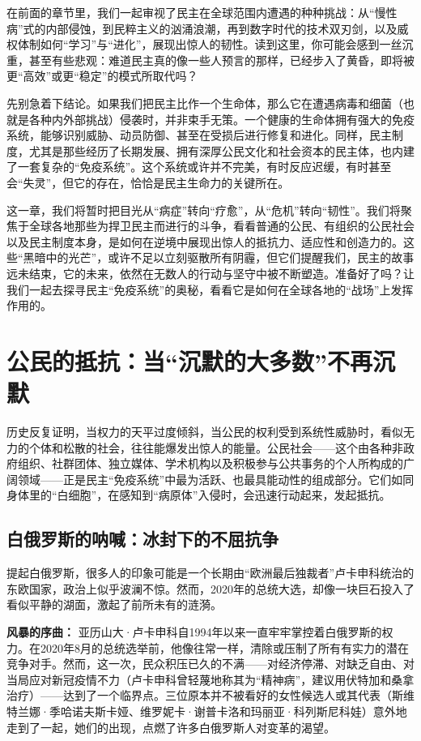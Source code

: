 \documentclass[UTF8, 10pt]{ctexbook}
\begin{document}
\lettrine[lines=3]{在}{前面}的章节里，我们一起审视了民主在全球范围内遭遇的种种挑战：从“慢性病”式的内部侵蚀，到民粹主义的汹涌浪潮，再到数字时代的技术双刃剑，以及威权体制如何“学习”与“进化”，展现出惊人的韧性。读到这里，你可能会感到一丝沉重，甚至有些悲观：难道民主真的像一些人预言的那样，已经步入了黄昏，即将被更“高效”或更“稳定”的模式所取代吗？

先别急着下结论。如果我们把民主比作一个生命体，那么它在遭遇病毒和细菌（也就是各种内外部挑战）侵袭时，并非束手无策。一个健康的生命体拥有强大的免疫系统，能够识别威胁、动员防御、甚至在受损后进行修复和进化。同样，民主制度，尤其是那些经历了长期发展、拥有深厚公民文化和社会资本的民主体，也内建了一套复杂的“免疫系统”。这个系统或许并不完美，有时反应迟缓，有时甚至会“失灵”，但它的存在，恰恰是民主生命力的关键所在。

这一章，我们将暂时把目光从“病症”转向“疗愈”，从“危机”转向“韧性”。我们将聚焦于全球各地那些为捍卫民主而进行的斗争，看看普通的公民、有组织的公民社会以及民主制度本身，是如何在逆境中展现出惊人的抵抗力、适应性和创造力的。这些“黑暗中的光芒”，或许不足以立刻驱散所有阴霾，但它们提醒我们，民主的故事远未结束，它的未来，依然在无数人的行动与坚守中被不断塑造。准备好了吗？让我们一起去探寻民主“免疫系统”的奥秘，看看它是如何在全球各地的“战场”上发挥作用的。

\section{公民的抵抗：当“沉默的大多数”不再沉默}
\lettrine[lines=2]{历}{史}反复证明，当权力的天平过度倾斜，当公民的权利受到系统性威胁时，看似无力的个体和松散的社会，往往能爆发出惊人的能量。公民社会——这个由各种非政府组织、社群团体、独立媒体、学术机构以及积极参与公共事务的个人所构成的广阔领域——正是民主“免疫系统”中最为活跃、也最具能动性的组成部分。它们如同身体里的“白细胞”，在感知到“病原体”入侵时，会迅速行动起来，发起抵抗。

\subsection{白俄罗斯的呐喊：冰封下的不屈抗争}
提起白俄罗斯，很多人的印象可能是一个长期由“欧洲最后独裁者”卢卡申科统治的东欧国家，政治上似乎波澜不惊。然而，2020年的总统大选，却像一块巨石投入了看似平静的湖面，激起了前所未有的涟漪。

\textbf{风暴的序曲：} 亚历山大·卢卡申科自1994年以来一直牢牢掌控着白俄罗斯的权力。在2020年8月的总统选举前，他像往常一样，清除或压制了所有有实力的潜在竞争对手。然而，这一次，民众积压已久的不满——对经济停滞、对缺乏自由、对当局应对新冠疫情不力（卢卡申科曾轻蔑地称其为“精神病”，建议用伏特加和桑拿治疗）——达到了一个临界点。三位原本并不被看好的女性候选人或其代表（斯维特兰娜·季哈诺夫斯卡娅、维罗妮卡·谢普卡洛和玛丽亚·科列斯尼科娃）意外地走到了一起，她们的出现，点燃了许多白俄罗斯人对变革的渴望。
\end{document}
